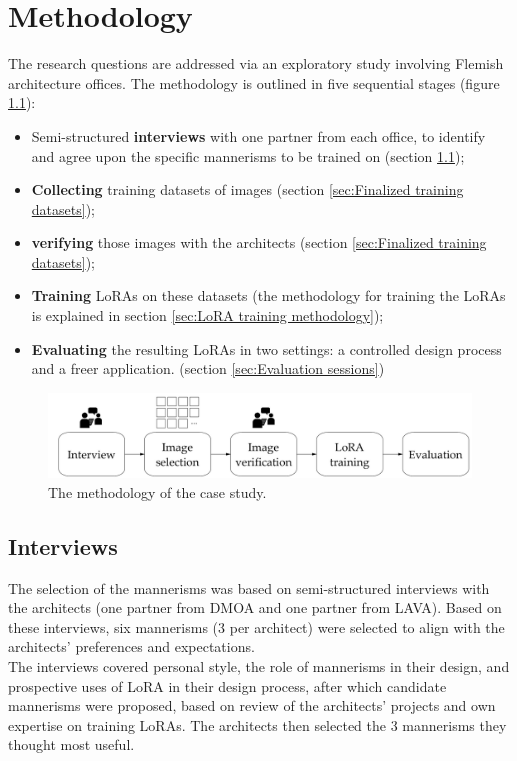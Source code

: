 \chapter{Methodology}

The research questions are addressed via an exploratory study involving Flemish architecture offices. The methodology is outlined in five sequential stages (figure \ref{fig:methodologycasestudy}):


\begin{itemize}
    \item Semi-structured \textbf{interviews} with one partner from each office, to identify and agree upon the specific mannerisms to be trained on (section \ref{sec:Interviews});
    \item \textbf{Collecting} training datasets of images (section \ref{sec:Finalized training datasets});
    \item \textbf{verifying} those images with the architects (section \ref{sec:Finalized training datasets});
    \item \textbf{Training} LoRAs on these datasets (the methodology for training the LoRAs is explained in section \ref{sec:LoRA training methodology});
    \item \textbf{Evaluating} the resulting LoRAs in two settings: a controlled design process and a freer application. (section \ref{sec:Evaluation sessions})
\end{itemize}
\begin{figure}[H]
    \centering
    \includegraphics[width=\linewidth]{Images/Methodology/Methodology.jpg}
    \caption{The methodology of the case study.}
    \label{fig:methodologycasestudy}
\end{figure}

\section{Interviews} \label{sec:Interviews}

The selection of the mannerisms was based on semi-structured interviews with the architects (one partner from DMOA and one partner from LAVA). Based on these interviews, six mannerisms (3 per architect) were selected to align with the architects' preferences and expectations.\\ The interviews covered personal style, the role of mannerisms in their design, and prospective uses of LoRA in their design process, after which candidate mannerisms were proposed, based on review of the architects' projects and own expertise on training LoRAs. The architects then selected the 3 mannerisms they thought most useful.

